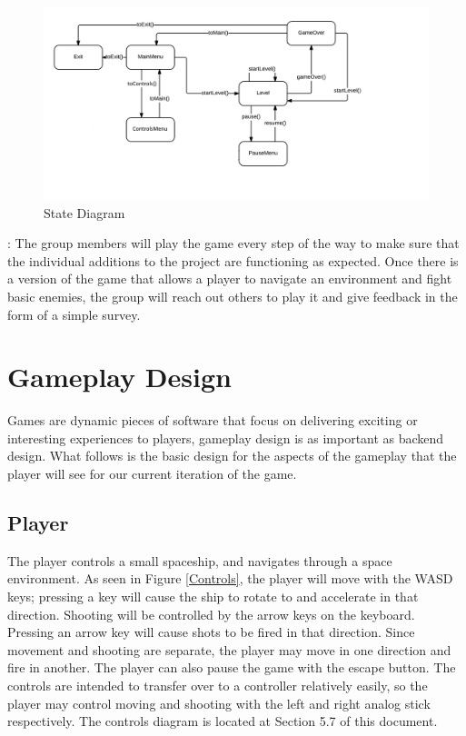 \documentclass[12pt]{article}       %
\def\hs{\hspace{15pt}}
\begin{document}
\begin{figure} [H]
\centering
\includegraphics[width=7in]{PewPewStateDiagramFinal.png}
\caption{State Diagram} \label{StateDia}
\end{figure}

\hs {\bf Testing plans}: The group members will play the game every step of the way to make sure that the individual additions to the project are functioning as expected. Once there is a version of the game that allows a player to navigate an environment and fight basic enemies, the group will reach out others to play it and give feedback in the form of a simple survey. 

\section{Gameplay Design} %
\label{sec:GPdesign}

Games are dynamic pieces of software that focus on delivering exciting or interesting experiences to players, gameplay design is as important as backend design. What follows is the basic design for the aspects of the gameplay that the player will see for our current iteration of the game.

\subsection{Player} %

	\hs {\bf Player controls: }The player controls a small spaceship, and navigates through a space environment. As seen in Figure \ref{Controls}, the player will move with the WASD keys; pressing a key will cause the ship to rotate to and accelerate in that direction.  Shooting will be controlled by the arrow keys on the keyboard. Pressing an arrow key will cause shots to be fired in that direction. Since movement and shooting are separate, the player may move in one direction and fire in another.  The player can also pause the game with the escape button. The controls are intended to transfer over to a controller relatively easily, so the player may control moving and shooting with the left and right analog stick respectively. The controls diagram is located at Section 5.7 of this document. \\
\end{document}
